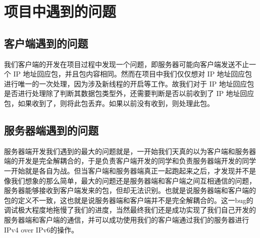 \chapter{项目中遇到的问题}

\section{客户端遇到的问题}
我们客户端的开发在项目过程中发现一个问题，即服务器可能向客户端发送不止一个 IP 地址回应包，并且包内容相同。然而在项目中我们仅仅想对 IP 地址回应包进行唯一的一次处理，因为涉及新线程的开启等工作。故我们对于 IP 地址回应包是否进行处理除了判断其数据包类型外，还需要判断是否以前收到了 IP 地址回应包，如果收到了，则将此包丢弃。如果以前没有收到，则处理此包。
\section{服务器端遇到的问题}
服务器端开发我们遇到的最大的问题就是，一开始我们天真的以为客户端和服务器端的开发是完全解耦合的，于是负责客户端开发的同学和负责服务器端开发的同学一开始就是各自为战。但当客户端和服务器端真正一起跑起来之后，才发现并不是像我们想象的那么简单，最大的问题还是服务器端和客户端之间互相通信的问题，服务器能够接收到客户端发来的包，但却无法识别。也就是说服务器端和客户端的包的定义不一致，这也就是说服务器端和客户端并不是完全解耦合的。这一bug的调试极大程度地拖慢了我们的进度，当然最终我们还是成功实现了我们自己开发的服务器端和客户端的通信，并可以成功使用我们的客户端通过我们的服务器进行IPv4 over IPv6的操作。